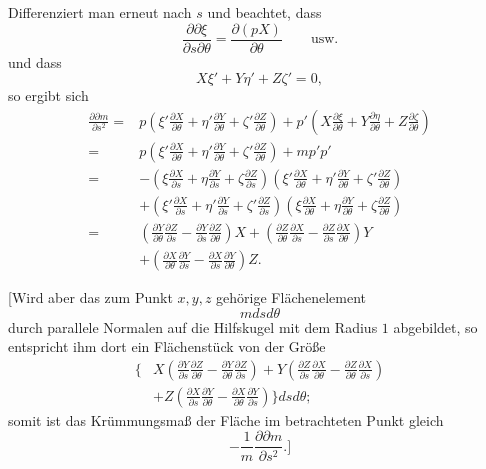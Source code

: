 %
\par\indent Differenziert man erneut nach $s$ und beachtet, dass
\[
\frac{\partial\partial\xi}{\partial s\partial\theta}=\frac{\partial(pX)}{\partial\theta}\qquad\text{usw.}
\]
und dass
\[
X\xi'+Y\eta'+Z\zeta'=0,
\]
so ergibt sich
\[
\begin{aligned}
\frac{\partial\partial m}{\partial s^{2}}={}&p\left(\xi'\frac{\partial X}{\partial\theta}+\eta'\frac{\partial Y}{\partial\theta}+\zeta'\frac{\partial Z}{\partial\theta}\right)+p'\left(X\frac{\partial\xi}{\partial\theta}+Y\frac{\partial\eta}{\partial\theta}+Z\frac{\partial\zeta}{\partial\theta}\right)\\
={}&p\left(\xi'\frac{\partial X}{\partial\theta}+\eta'\frac{\partial Y}{\partial\theta}+\zeta'\frac{\partial Z}{\partial\theta}\right)+mp'p'\\
={}&-\left(\xi\frac{\partial X}{\partial s}+\eta\frac{\partial Y}{\partial s}+\zeta\frac{\partial Z}{\partial s}\right)\left(\xi'\frac{\partial X}{\partial\theta}+\eta'\frac{\partial Y}{\partial\theta}+\zeta'\frac{\partial Z}{\partial\theta}\right)\\
&+\left(\xi'\frac{\partial X}{\partial s}+\eta'\frac{\partial Y}{\partial s}+\zeta'\frac{\partial Z}{\partial s}\right)\left(\xi\frac{\partial X}{\partial\theta}+\eta\frac{\partial Y}{\partial\theta}+\zeta\frac{\partial Z}{\partial\theta}\right)\\
={}&\left(\frac{\partial Y}{\partial\theta}\frac{\partial Z}{\partial s}-\frac{\partial Y}{\partial s}\frac{\partial Z}{\partial\theta}\right)X+\left(\frac{\partial Z}{\partial\theta}\frac{\partial X}{\partial s}-\frac{\partial Z}{\partial s}\frac{\partial X}{\partial\theta}\right)Y\\
&+\left(\frac{\partial X}{\partial\theta}\frac{\partial Y}{\partial s}-\frac{\partial X}{\partial s}\frac{\partial Y}{\partial\theta}\right)Z.
\end{aligned}
\]

[Wird aber das zum Punkt $x,y,z$ gehörige Flächenelement
\[
mdsd\theta
\]
durch parallele Normalen auf die Hilfskugel mit dem Radius $1$ abgebildet, so entspricht ihm dort ein Flächenstück von der Größe
\[
\begin{aligned}
\Biggl\{&X\left(\frac{\partial Y}{\partial s}\frac{\partial Z}{\partial\theta}-\frac{\partial Y}{\partial\theta}\frac{\partial Z}{\partial s}\right)+Y\left(\frac{\partial Z}{\partial s}\frac{\partial X}{\partial\theta}-\frac{\partial Z}{\partial\theta}\frac{\partial X}{\partial s}\right)\\
&+Z\left(\frac{\partial X}{\partial s}\frac{\partial Y}{\partial\theta}-\frac{\partial X}{\partial\theta}\frac{\partial Y}{\partial s}\right)\Biggr\}dsd\theta;
\end{aligned}
\]
somit ist das Krümmungsmaß der Fläche im betrachteten Punkt gleich
\[
-\frac1m\frac{\partial\partial m}{\partial s^{2}}.\biggr]
\]
